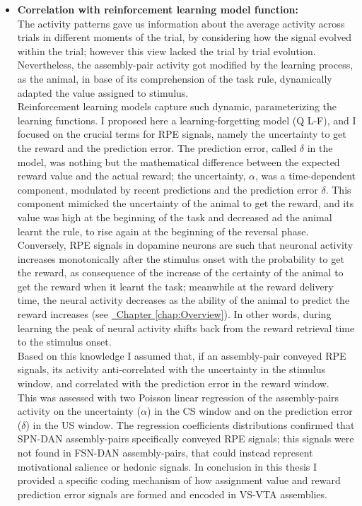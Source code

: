 \begin{itemize}
    \item \textbf{Correlation with reinforcement learning model function:}\\The activity patterns gave us information about the average activity across trials in different moments of the trial, by considering how the signal evolved within the trial; however this view lacked the trial by trial evolution. Nevertheless, the assembly-pair activity got modified by the learning process, as the animal, in base of its comprehension of the task rule, dynamically adapted the value assigned to stimulus.\\Reinforcement learning models capture such dynamic, parameterizing the learning functions. I proposed here a learning-forgetting model (Q L-F), and I focused on the crucial terms for RPE signals, namely the uncertainty to get the reward and the prediction error. The prediction error, called $\delta$ in the model, was nothing but the mathematical difference between the expected reward value and the actual reward; the uncertainty, $\alpha$, was a time-dependent component, modulated by recent predictions and the prediction error $\delta$. This component mimicked the uncertainty of the animal to get the reward, and its value was high at the beginning of the task and decreased ad the animal learnt the rule, to rise again at the beginning of the reversal phase.\\Conversely, RPE signals in dopamine neurons are such that neuronal activity increases monotonically after the stimulus onset with the probability to get the reward, as consequence of the increase of the certainty of the animal to get the reward when it learnt the task; meanwhile at the reward delivery time, the neural activity decreases as the ability of the animal to predict the reward increases (see \hyperref[chap:Overview]{~Chapter \ref*{chap:Overview}}). In other words, during learning the peak of neural activity shifts back from the reward retrieval time to the stimulus onset.\\Based on this knowledge I assumed that, if an assembly-pair conveyed RPE signals, its activity anti-correlated with the uncertainty in the stimulus window, and correlated with the prediction error in the reward window.\\This was assessed with two Poisson linear regression of the assembly-pairs activity on the uncertainty ($\alpha$) in the CS window and on the prediction error ($\delta$) in the US window. The regression coefficients distributions confirmed that SPN-DAN assembly-pairs specifically conveyed RPE signals; this signals were not found in FSN-DAN assembly-pairs, that could instead represent motivational salience or hedonic signals. In conclusion in this thesis I provided a specific coding mechanism of how assignment value and reward prediction error signals are formed and encoded in VS-VTA assemblies.
\end{itemize}
